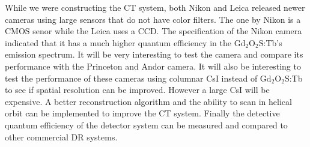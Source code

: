 While we were constructing the CT system, both Nikon and Leica released newer cameras using large sensors that do not have color filters.  The one by Nikon is a CMOS senor while the Leica uses a CCD.  The specification of the Nikon camera indicated that it has a much higher quantum efficiency in the $\mathrm{Gd_2O_2S}$:Tb's emission spectrum.  It will be very interesting to test the camera and compare its performance with the Princeton and Andor camera.  It will also be interesting to test the performance of these cameras using columnar CsI instead of $\mathrm{Gd_2O_2S}$:Tb to see if spatial resolution can be improved.  However a large CsI will be expensive.  A better reconstruction algorithm and the ability to scan in helical orbit can be implemented to improve the CT system.  Finally the detective quantum efficiency of the detector system can be measured and compared to other commercial DR systems.

